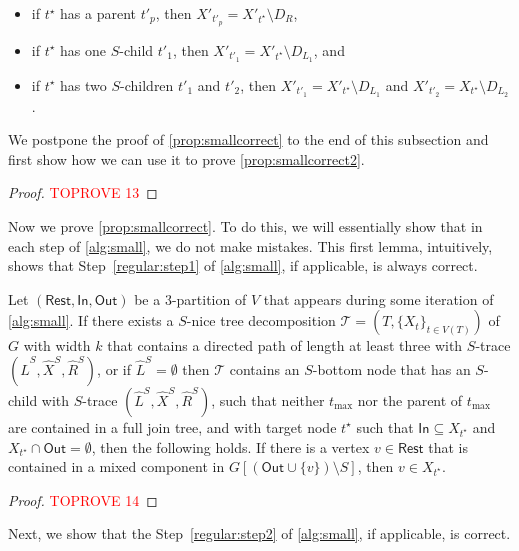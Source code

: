 \documentclass[a4paper,UKenglish,cleveref, autoref, thm-restate, numberwithinsect]{lipics-v2021}
\newcommand{\slim}{\text{slim}\xspace}
\newcommand{\In}{\mathsf{In}}
\newcommand{\Out}{\mathsf{Out}}
\newcommand{\Rest}{\mathsf{Rest}}
\begin{document}
\begin{lemma}
\begin{itemize}
\begin{itemize}
    \item if $t^{\star}$ has a parent $t'_p$, then $X'_{t'_p}=X'_{t^{\star}}\setminus D_R$, 
    \item if $t^{\star}$ has one $S$-child $t'_1$, then $X'_{t'_1}=X'_{t^{\star}}\setminus D_{L_1}$, and 
    \item if $t^{\star}$ has two $S$-children $t'_1$ and $t'_2$, then $X'_{t'_1}=X'_{t^{\star}}\setminus D_{L_1}$ and $X'_{t'_2}=X_{t^{\star}}\setminus D_{L_2}$.
\end{itemize}
\end{itemize}
\end{lemma}

We postpone the proof of \cref{prop:smallcorrect} to the end of this subsection and first show how we can use it to prove \cref{prop:smallcorrect2}.

\begin{proof}\textcolor{red}{TOPROVE 13}\end{proof}




Now we prove \cref{prop:smallcorrect}. To do this, we will essentially show that in each step of \cref{alg:small}, we do not make mistakes. This first lemma, intuitively, shows that Step~\ref{regular:step1} of \cref{alg:small}, if applicable, is always correct.
\begin{lemma}\label{lem:regularstep1}
Let $(\Rest,\In,\Out)$ be a 3-partition of $V$ that appears during some iteration of \cref{alg:small}. 
If there exists a \slim $S$-nice tree decomposition $\mathcal{T}=(T,\{X_t\}_{t\in V(T)})$ of $G$ with width $k$ that contains a directed path of length at least three with $S$-trace $(\hat{L}^S, \hat{X}^S, \hat{R}^S)$, or if $\hat{L}^S=\emptyset$ then $\mathcal{T}$ contains an $S$-bottom node that has an $S$-child with $S$-trace $(\hat{L}^S, \hat{X}^S, \hat{R}^S)$, such that neither $t_{\max}$ nor the parent of $t_{\max}$ are contained in a full join tree, and with target node ${t^\star}$ such that $\In\subseteq X_{t^\star}$ and $X_{t^\star}\cap \Out=\emptyset$, then the following holds.
If there is a vertex $v\in \Rest$ that is contained in a mixed component in $G[(\Out\cup\{v\})\setminus S]$, then $v\in X_{t^\star}$.
\end{lemma}
\begin{proof}\textcolor{red}{TOPROVE 14}\end{proof}

Next, we show that the Step~\ref{regular:step2} of \cref{alg:small}, if applicable, is correct.
\end{document}
